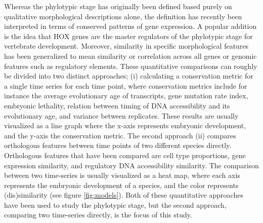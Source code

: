 Whereas the phylotypic stage has originally been defined based purely on qualitative morphological descriptions alone, the definition has recently been interpreted in terms of conserved patterns of gene expression. A popular addition is the idea that HOX genes are the master regulators of the phylotypic stage for vertebrate development\cite{Duboule1994}. Moreover, similarity in specific morphological features has been generalized to mean similarity or correlation across all genes or genomic features such as regulatory elements. These quantitative comparisons can roughly be divided into two distinct approaches; (i) calculating a conservation metric for a single time series for each time point, where conservation metrics include for instance the average evolutionary age of transcripts\cite{DomazetLoso2010}, gene mutation rate index\cite{Quint2012, Piasecka2013}, embryonic lethality\cite{Uchida2018}, relation between timing of DNA accessibility and its evolutionary age\cite{Uesaka2019}, and variance between replicates\cite{Liu2020, Uchida2022}. These results are usually visualized as a line graph where the x-axis represents embryonic development, and the y-axis the conservation metric. The second approach (ii) compares orthologous features between time points of two different species directly. Orthologous features that have been compared are cell type proportions\cite{Mayshar2023}, gene expression similarity\cite{Irie2011, Kalinka2010, Levin2016, marletaz2018, PerezPosada2022, Leong2021}, and regulatory DNA accessibility similarity\cite{Hu2017, Liu2021}. The comparison between two time-series is usually visualized as a heat map, where each axis represents the embryonic development of a species, and the color represents (dis)similarity (see figure \ref{fig:models}). Both of these quantitative approaches have been used to study the phylotypic stage, but the second approach, comparing two time-series directly, is the focus of this study. 


